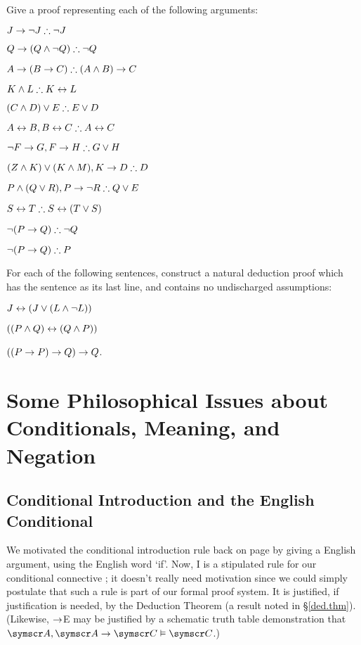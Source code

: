 \newpage\problempart
\label{pr.solvedTFLproofs}
Give a proof representing each of the following arguments:
\begin{earg}
\item $J\rightarrow\neg J \mathrel{\therefore} \neg J$
\item $Q\rightarrow(Q\wedge\neg Q) \mathrel{\therefore} \neg Q$
\item $A\rightarrow (B\rightarrow C) \mathrel{\therefore} (A\wedge B)\rightarrow C$
\item $K\wedge L \mathrel{\therefore} K\leftrightarrow L$
\item $(C\wedge D)\vee E \mathrel{\therefore} E\vee D$
\item $A\leftrightarrow B, B\leftrightarrow C \mathrel{\therefore} A\leftrightarrow C$
\item $\neg F\rightarrow G, F\rightarrow H \mathrel{\therefore} G\vee H$
\item $(Z\wedge K) \vee (K\wedge M), K \rightarrow D \mathrel{\therefore} D$
\item $P \wedge (Q\vee R), P\rightarrow \neg R \mathrel{\therefore} Q\vee E$
\item $S\leftrightarrow T \mathrel{\therefore} S\leftrightarrow (T\vee S)$
\item $\neg (P \rightarrow Q) \mathrel{\therefore} \neg Q$
\item $\neg (P \rightarrow Q) \mathrel{\therefore} P$
\end{earg}

\problempart
For each of the following sentences, construct a natural deduction proof which has the sentence as its last line, and contains no undischarged assumptions: \begin{earg}
	\item $J \leftrightarrow (J \vee (L \wedge \neg L))$
	\item $((P \wedge Q) \leftrightarrow (Q \wedge P))$
	\item $((P \rightarrow P) \rightarrow Q) \rightarrow Q$.
\end{earg}

\chapter{Some Philosophical Issues about Conditionals, Meaning, and Negation}\label{s:philosophy}


\section{Conditional Introduction and the English Conditional} \label{cond.proof}%

We motivated the conditional introduction rule back on page \pageref{ci.motivate} by giving a English argument, using the English word `if'. Now, {\eif}I is a stipulated rule for our conditional connective \eif; it doesn't really need motivation since we could simply postulate that such a rule is part of our formal proof system. It is justified, if justification is needed, by the Deduction Theorem (a result noted in §\ref{ded.thm}). (Likewise, $\rightarrow$E may be justified by a schematic truth table demonstration that $\meta{A}, \meta{A}\eif\meta{C} \vDash \meta{C}$.)

